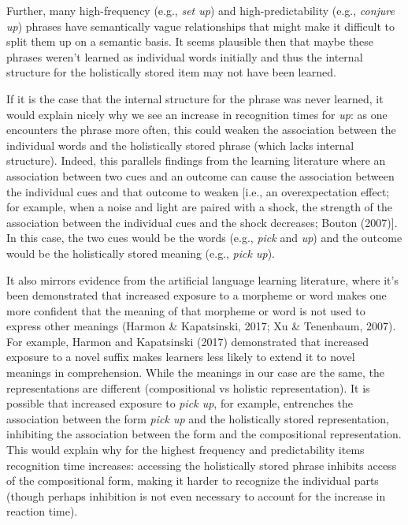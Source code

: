 \documentclass[
  man,floatsintext]{apa6}
\begin{document}
Further, many high-frequency (e.g., \emph{set up}) and high-predictability (e.g., \emph{conjure up}) phrases have semantically vague relationships that might make it difficult to split them up on a semantic basis. It seems plausible then that maybe these phrases weren't learned as individual words initially and thus the internal structure for the holistically stored item may not have been learned.

If it is the case that the internal structure for the phrase was never learned, it would explain nicely why we see an increase in recognition times for \emph{up}: as one encounters the phrase more often, this could weaken the association between the individual words and the holistically stored phrase (which lacks internal structure). Indeed, this parallels findings from the learning literature where an association between two cues and an outcome can cause the association between the individual cues and that outcome to weaken {[}i.e., an overexpectation effect; for example, when a noise and light are paired with a shock, the strength of the association between the individual cues and the shock decreases; Bouton (2007){]}. In this case, the two cues would be the words (e.g., \emph{pick} and \emph{up}) and the outcome would be the holistically stored meaning (e.g., \emph{pick up}).

It also mirrors evidence from the artificial language learning literature, where it's been demonstrated that increased exposure to a morpheme or word makes one more confident that the meaning of that morpheme or word is not used to express other meanings (Harmon \& Kapatsinski, 2017; Xu \& Tenenbaum, 2007). For example, Harmon and Kapatsinski (2017) demonstrated that increased exposure to a novel suffix makes learners less likely to extend it to novel meanings in comprehension. While the meanings in our case are the same, the representations are different (compositional vs holistic representation). It is possible that increased exposure to \emph{pick up}, for example, entrenches the association between the form \emph{pick up} and the holistically stored representation, inhibiting the association between the form and the compositional representation. This would explain why for the highest frequency and predictability items recognition time increases: accessing the holistically stored phrase inhibits access of the compositional form, making it harder to recognize the individual parts (though perhaps inhibition is not even necessary to account for the increase in reaction time).
\end{document}
